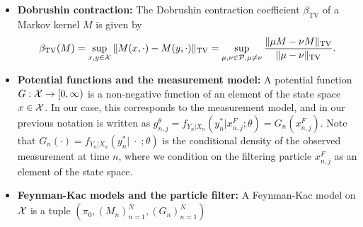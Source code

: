 \begin{itemize}
\item \textbf{Dobrushin contraction:} The Dobrushin contraction coefficient $\beta_{\text{TV}}$ of a Markov kernel $M$ is given by
$$\beta_{\mathrm{TV}}(M)=\sup _{x, y \in {\mathcal{X}}}\|M(x, \cdot)-M(y, \cdot)\|_{\mathrm{TV}}=\sup _{\mu, \nu \in \mathcal{P}, \mu \neq \nu} \frac{\|\mu M-\nu M\|_{\mathrm{TV}}}{\|\mu-\nu\|_{\mathrm{TV}}}.$$
\item \textbf{Potential functions and the measurement model:} A potential function $G : {\mathcal{X}} \to [0,\infty)$ is a non-negative function of an element of the state space $x \in {\mathcal{X}}$. In our case, this corresponds to the measurement model, and in our previous notation is written as $g_{n,j}^\theta = f_{Y_n|X_n}(y_n^*|x_{n,j}^F; \theta) = G_n(x_{n,j}^F)$. Note that $G_n(\cdot) = f_{Y_n|X_n}(y_n^*|\;\cdot\; ; \theta)$ is the conditional density of the observed measurement at time $n$, where we condition on the filtering particle $x_{n,j}^F$ as an element of the state space. 
\item \textbf{Feynman-Kac models and the particle filter:} A Feynman-Kac model on ${\mathcal{X}}$ is a tuple $(\pi_0, (M_n)_{n=1}^N, (G_n)_{n=1}^N)$ 
\end{itemize}